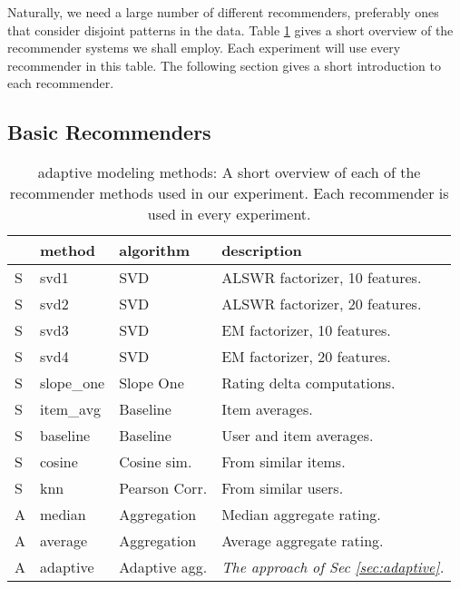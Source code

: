 Naturally, we need a large number of different recommenders, preferably ones that consider
disjoint patterns in the data. Table \ref{table:results:methods}
gives a short overview of the recommender systems we shall employ.
Each experiment will use every recommender in this table.
The following section gives a short introduction to each recommender.

\subsection{Basic Recommenders}

\begin{table}
  \caption[Adaptive Modeling Methods]{
    adaptive modeling methods: A short overview of each of the recommender methods
    used in our experiment.
    Each recommender is used in every experiment. 
  }
  \setlength{\extrarowheight}{0.2em}
  \vspace{1em}
  \begin{tabular*}{0.48\textwidth}{ l l l l }
    \hline
    { } & \textbf{method} & \textbf{algorithm} & \textbf{description} \\
    \hline
    S & svd1          & SVD                   & ALSWR factorizer, 10 features. \\
    S & svd2          & SVD                   & ALSWR factorizer, 20 features. \\
    S & svd3          & SVD                   & EM factorizer, 10 features. \\
    S & svd4          & SVD                   & EM factorizer, 20 features. \\
    S & slope\_one    & Slope One             & Rating delta computations. \\
    S & item\_avg     & Baseline              & Item averages. \\ 
    S & baseline      & Baseline              & User and item averages.\\ 
    S & cosine   	    & Cosine sim.           & From similar items.\\ 
    S & knn       	  & Pearson Corr.         & From similar users.\\
    \hline
    A & median    	  & Aggregation           & Median aggregate rating. \\
    A & average    	  & Aggregation           & Average aggregate rating. \\
    A & adaptive      & Adaptive agg.         & \emph{The approach of Sec \ref{sec:adaptive}.} \\
    \hline
  \end{tabular*}
  \label{table:results:methods}
\end{table}

